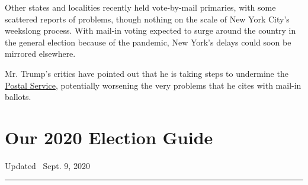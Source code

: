Other states and localities recently held vote-by-mail primaries, with
some scattered reports of problems, though nothing on the scale of New
York City's weekslong process. With mail-in voting expected to surge
around the country in the general election because of the pandemic, New
York's delays could soon be mirrored elsewhere.

Mr. Trump's critics have pointed out that he is taking steps to
undermine the
\href{https://www.nytimes3xbfgragh.onion/2020/08/13/us/politics/trump-postal-service-mail-voting.html}{Postal
Service}, potentially worsening the very problems that he cites with
mail-in ballots.

\hypertarget{our-2020-election-guide}{%
\section{Our 2020 Election Guide}\label{our-2020-election-guide}}

Updated ~Sept. 9, 2020

\begin{center}\rule{0.5\linewidth}{\linethickness}\end{center}

